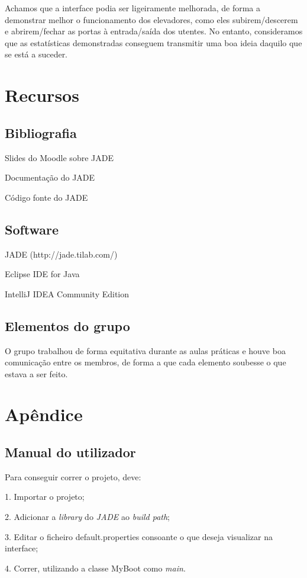 ﻿\documentclass[a4paper]{article}
\begin{document}
Achamos que a interface podia ser ligeiramente melhorada, de forma a demonstrar melhor o funcionamento dos elevadores, como eles subirem/descerem e abrirem/fechar as portas à entrada/saída dos utentes. No entanto, consideramos que as estatísticas demonstradas conseguem transmitir uma boa ideia daquilo que se está a suceder.

\newpage


\section{Recursos}

\subsection{Bibliografia} 

Slides do Moodle sobre JADE

Documentação do JADE

Código fonte do JADE

\subsection{Software} 

JADE (http://jade.tilab.com/)

Eclipse IDE for Java

IntelliJ IDEA Community Edition

\subsection{Elementos do grupo}

O grupo trabalhou de forma equitativa durante as aulas práticas e houve boa comunicação entre os membros, de forma a que cada elemento soubesse o que estava a ser feito.

\section{Apêndice}

\subsection{Manual do utilizador} 

Para conseguir correr o projeto, deve:

1. Importar o projeto;

2. Adicionar a \textit{library} do \textit{JADE} ao \textit{build path};

3. Editar o ficheiro default.properties consoante o que deseja visualizar na interface;

4. Correr, utilizando a classe MyBoot como \textit{main}.

\newpage

\end{document}
